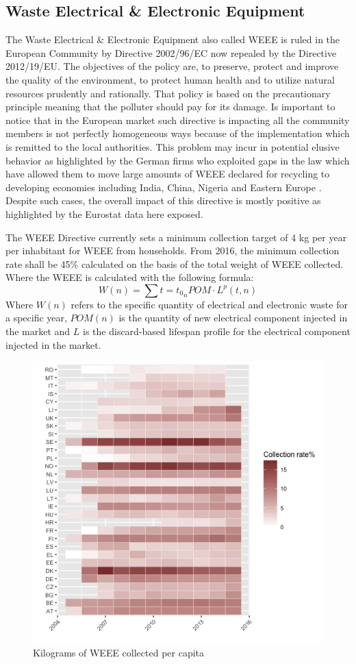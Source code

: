 \documentclass{article}
\begin{document}
\subsection{Waste Electrical \& Electronic Equipment}
The Waste Electrical \& Electronic Equipment also called WEEE is ruled in the European Community by Directive 2002/96/EC now repealed by the Directive 2012/19/EU. The objectives of the policy are, to preserve, protect and improve the quality of the environment, to protect human health and to utilize natural resources prudently and rationally. That policy is based on the precautionary principle meaning that the polluter should pay for its damage. Is important to notice that in the European market such directive is impacting all the community members is not perfectly homogeneous ways because of the implementation which is remitted to the local authorities. This problem may incur in potential elusive behavior as highlighted by the German firms who exploited gaps in the law which have allowed them to move large amounts of WEEE declared for recycling to developing economies including India, China, Nigeria and Eastern Europe \cite{ongondo_how_2011}. Despite such cases, the overall impact of this directive is mostly positive as highlighted by the Eurostat data here exposed.

The WEEE Directive currently sets a minimum collection target of 4 kg per year per inhabitant for WEEE from households. From 2016, the minimum collection rate shall be 45\% calculated on the basis of the total weight of WEEE collected. Where the WEEE is calculated with the following formula:
$$
W (n) = \sum{t = t_0}_{n} POM \cdot L^p(t,n)
$$
Where $W(n)$ refers to the specific quantity of electrical and electronic waste for a specific year, $POM(n)$ is the quantity of new electrical component injected in the market and $L$ is the discard-based lifespan profile for the electrical component injected in the market.

\begin{figure}
\centering
\includegraphics[width=0.5\linewidth]{Images/heatmap.png}
\caption{Kilograms of WEEE collected per capita}
\end{figure}
\end{document}
